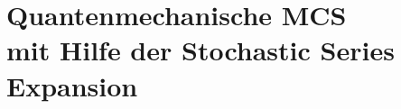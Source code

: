 \chapter[Quantenmechanische MCS mit Hilfe der Stochastic Series Expansion]{Quantenmechanische MCS\\\LARGE mit Hilfe der Stochastic Series Expansion}